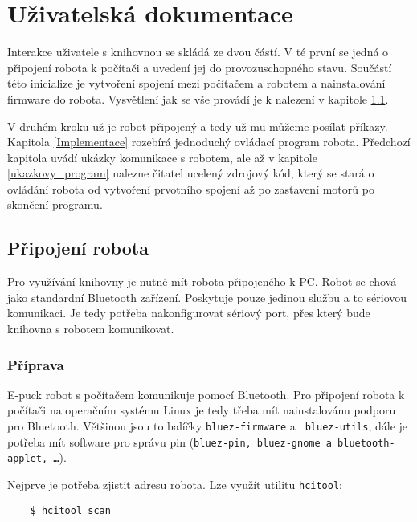 \chapter{Uživatelská dokumentace}
\label{dokumentace}

    Interakce uživatele s knihovnou se skládá ze dvou částí. V té první se
    jedná o připojení robota k počítači a uvedení jej do provozuschopného
    stavu. Součástí této inicialize je vytvoření spojení mezi počítačem a
    robotem a nainstalování firmware do robota. Vysvětlení jak se vše provádí
    je k nalezení v kapitole \ref{pripojeni_robota}.

    V druhém kroku už je robot připojený a tedy už mu můžeme posílat příkazy.
    Kapitola \ref{Implementace} rozebírá jednoduchý ovládací program robota.
    Předchozí kapitola uvádí ukázky komunikace s robotem, ale až v kapitole
    \ref{ukazkovy_program} nalezne čitatel ucelený zdrojový kód, který se stará
    o ovládání robota od vytvoření prvotního spojení až po zastavení motorů po
    skončení programu.

    \section{Připojení robota}
    \label{pripojeni_robota}

    Pro využívání knihovny je nutné mít robota připojeného k PC. Robot se chová
    jako standardní Bluetooth zařízení. Poskytuje pouze jedinou službu a to
    sériovou komunikaci. Je tedy potřeba nakonfigurovat sériový port, přes
    který bude knihovna s robotem komunikovat.

    \subsection{Příprava}

    E-puck robot s počítačem komunikuje pomocí Bluetooth. Pro připojení robota
    k počítači na operačním systému Linux je tedy třeba mít nainstalovánu
    podporu pro Bluetooth. Většinou jsou to balíčky {\tt bluez-firmware} a {\tt
    bluez-utils}, dále je potřeba mít software pro správu pin ({\tt bluez-pin,
    bluez-gnome a bluetooth-applet, \ldots}).

    Nejprve je potřeba zjistit adresu robota. Lze využít utilitu {\tt hcitool}:

    \begin{verbatim}
    $ hcitool scan
    \end{verbatim}

